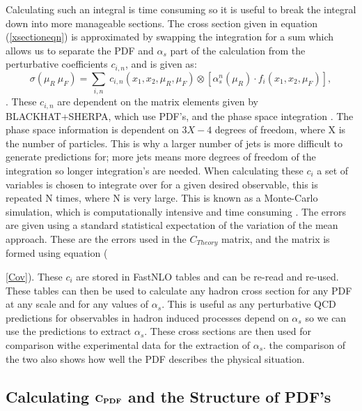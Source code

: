 \documentclass[12pt, onecolumn, nofootinbib]{revtex4}    %
\begin{document}
Calculating such an integral is time consuming so it is useful to break the integral down into more manageable sections. The cross section given in equation (\ref{xsectioneqn}) is approximated by swapping the integration for a sum which allows us to separate the PDF and ${\alpha_s}$ part of the calculation from the perturbative coefficients ${c_{i,n}}$, and is given as: \begin{equation} \label{xsectioneqn} \sigma(\mu_R \ \mu_F) = \sum_{i,n}  \  c_{i,n} \left( x_1, x_2, \mu_R, \mu_F \right) \otimes [\alpha_s^n (\mu_R) \cdot f_i(x_1, x_2, \mu_F)], \end{equation}. These ${c_{i,n}}$ are dependent on the matrix elements given by BLACKHAT+SHERPA, which use PDF's, and the phase space integration  \cite{BLACK}. The phase space information is dependent on ${3X-4}$ degrees of freedom, where X is the number of particles. This is why a larger number of jets is more difficult to generate predictions for; more jets means more degrees of freedom of the integration so longer integration's are needed. When calculating these ${c_i}$  a set of variables is chosen to integrate over for a given desired observable, this is repeated N times, where N is very large. This is known as a Monte-Carlo simulation, which is computationally intensive and time consuming \cite{MONTE}. The errors are given using a standard statistical expectation of the variation of the mean approach. These are the errors used in the ${C_{Theory}}$ matrix, and the matrix is formed using equation ({\ref{Cov}). These ${c_i}$ are stored in FastNLO tables and can be re-read and re-used. These tables can then be used to calculate any hadron cross section for any PDF at any scale and for any values of ${\alpha_s}$. This is useful as any perturbative QCD predictions for observables in hadron induced processes depend on ${\alpha_s}$ so we can use the predictions to extract ${\alpha_s}$. These cross sections are then used for comparison withe experimental data for the extraction of ${\alpha_s}$. the comparison of the two also shows how well the PDF describes the physical situation.




\subsection{Calculating ${\bold{C_{PDF}}}$ and the Structure of PDF's} \label{PDF}


}
\end{document}
